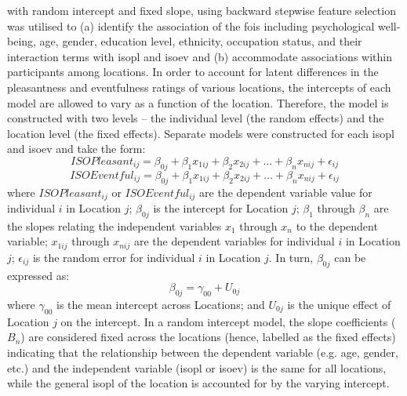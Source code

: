  with random intercept and fixed slope, using backward stepwise feature selection was utilised to (a) identify the association of the \glspl{foi} including psychological well-being, age, gender, education level, ethnicity, occupation status, and their interaction terms with \gls{isopl} and \gls{isoev} and (b) accommodate associations within participants among locations. In order to account for latent differences in the pleasantness and eventfulness ratings of various locations, the intercepts of each model are allowed to vary as a function of the location. Therefore, the model is constructed with two levels -- the individual level (the random effects) and the location level (the fixed effects). Separate models were constructed for each \gls{isopl} and \gls{isoev} and take the form:
%
\begin{equation}
  \label{eqn:whoPl}
  ISOPleasant_{ij} = \beta_{0j} + \beta_1 x_{1ij} + \beta_2 x_{2ij} + \ldots + \beta_n x_{nij} + \epsilon_{ij}
\end{equation}
%
\begin{equation}
  \label{eqn:whoEv}
  ISOEventful_{ij} = \beta_{0j} + \beta_1 x_{1ij} + \beta_2 x_{2ij} + \ldots + \beta_n x_{nij} + \epsilon_{ij}
\end{equation}
%
where $ISOPleasant_{ij}$ or $ISOEventful_{ij}$ are the dependent variable value for individual $i$ in Location $j$; $\beta_{0j}$ is the intercept for Location $j$; $\beta_1$ through $\beta_n$ are the slopes relating the independent variables $x_1$ through $x_n$ to the dependent variable; $x_{1ij}$ through $x_{nij}$ are the dependent variables for individual $i$ in Location $j$; $\epsilon_{ij}$ is the random error for individual $i$ in Location $j$. In turn, $\beta_{0j}$ can be expressed as:
%
\begin{equation}
  \beta_{0j} = \gamma_{00} + U_{0j}
\end{equation}
%
where $\gamma_{00}$ is the mean intercept across Locations; and $U_{0j}$ is the unique effect of Location $j$ on the intercept. In a random intercept model, the slope coefficients ($B_n$) are considered fixed across the locations (hence, labelled as the fixed effects) indicating that the relationship between the dependent variable (e.g. age, gender, etc.) and the independent variable (\gls{isopl} or \gls{isoev}) is the same for all locations, while the general \gls{isopl} of the location is accounted for by the varying intercept.

